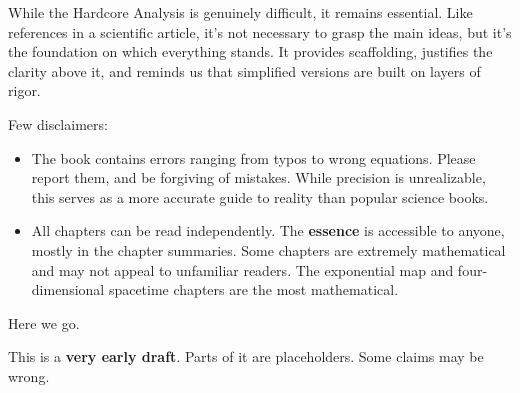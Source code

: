 \begin{tcolorbox}
While the Hardcore Analysis is genuinely difficult, it remains essential. Like references in a scientific article, it's not necessary to grasp the main ideas, but it's the foundation on which everything stands. It provides scaffolding, justifies the clarity above it, and reminds us that simplified versions are built on layers of rigor.

Few disclaimers:

\begin{itemize}
    \item The book contains errors ranging from typos to wrong equations. Please report them, and be forgiving of mistakes. While precision is unrealizable, this serves as a more accurate guide to reality than popular science books.

    \item All chapters can be read independently. The \textbf{essence} is accessible to anyone, mostly in the chapter summaries. Some chapters are extremely mathematical and may not appeal to unfamiliar readers. The exponential map and four-dimensional spacetime chapters are the most mathematical.
\end{itemize}

Here we go.
\end{tcolorbox}


\begin{tcolorbox}[
    colback=red!5,
    colframe=red!60!black,
    boxrule=1pt,
    arc=0.5mm,
    left=10pt,
    right=10pt,
    top=10pt,
    bottom=10pt,
    width=\textwidth,
    sharp corners=south,
    breakable,
    title=\textbf{DRAFT WARNING}
]
\setlength{\parskip}{1em}

This is a \textbf{very early draft}. Parts of it are placeholders. Some claims may be wrong.

\end{tcolorbox}
